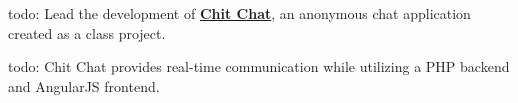\documentclass[]{deedy-resume-reversed}
\begin{document}
\begin{minipage}[t]{0.60\textwidth}
\begin{tightemize}
\item todo: Lead the development of \textbf{\href{https://github.com/user/repo}{Chit Chat}}, an anonymous chat application created as a class project.
\item todo: Chit Chat provides real-time communication while utilizing a PHP backend and AngularJS frontend.
\end{tightemize}
\sectionsep








\end{minipage}
\end{document}

